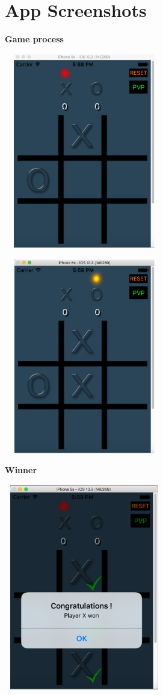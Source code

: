 \section{App Screenshots}
\textbf{Game process}
\begin{center} 
\includegraphics[width=7cm, height=8.5cm]{4.eps}
\end{center}
\begin{center} 
\includegraphics[width=7cm, height=8.5cm]{5.eps}
\end{center}
\textbf{Winner}
\begin{center} 
\includegraphics[width=7cm, height=9cm]{6.eps}
\end{center}
